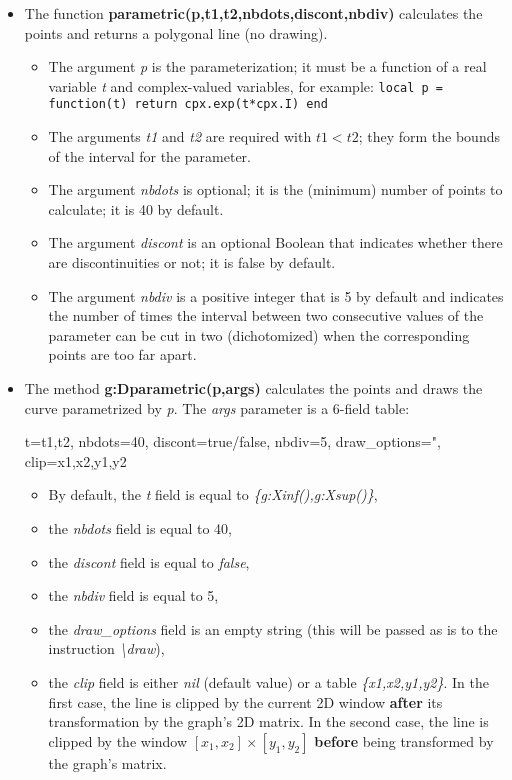 \begin{itemize}
    \item The function \textbf{parametric(p,t1,t2,nbdots,discont,nbdiv)} calculates the points and returns a polygonal line (no drawing).
\begin{itemize}
    \item The argument \emph{p} is the parameterization; it must be a function of a real variable \emph{t} and complex-valued variables, for example:
\texttt{local p = function(t) return cpx.exp(t*cpx.I) end}
    \item The arguments \emph{t1} and \emph{t2} are required with \(t1 < t2\); they form the bounds of the interval for the parameter.     \item The argument \emph{nbdots} is optional; it is the (minimum) number of points to calculate; it is 40 by default.
    \item The argument \emph{discont} is an optional Boolean that indicates whether there are discontinuities or not; it is false by default.
    \item The argument \emph{nbdiv} is a positive integer that is 5 by default and indicates the number of times the interval between two consecutive values ​​of the parameter can be cut in two (dichotomized) when the corresponding points are too far apart.
\end{itemize}

    \item The method \textbf{g:Dparametric(p,args)} calculates the points and draws the curve parametrized by \emph{p}. The \emph{args} parameter is a 6-field table:

\begin{TeXcode}
{ t={t1,t2}, nbdots=40, discont=true/false, nbdiv=5, draw_options=", clip={x1,x2,y1,y2} }
\end{TeXcode}

\begin{itemize}
    \item By default, the \emph{t} field is equal to \emph{\{g:Xinf(),g:Xsup()\}},
    \item the \emph{nbdots} field is equal to 40,
    \item the \emph{discont} field is equal to \emph{false},
    \item the \emph{nbdiv} field is equal to 5,
    \item the \emph{draw\_options} field is an empty string (this will be passed as is to the instruction \emph{\textbackslash draw}),
    \item the \emph{clip} field is either \emph{nil} (default value) or a table \emph{\{x1,x2,y1,y2\}}. In the first case, the line is clipped by the current 2D window \textbf{after} its transformation by the graph's 2D matrix. In the second case, the line is clipped by the window $[x_1,x_2]\times[y_1,y_2]$ \textbf{before} being transformed by the graph's matrix.
\end{itemize}
\end{itemize}



